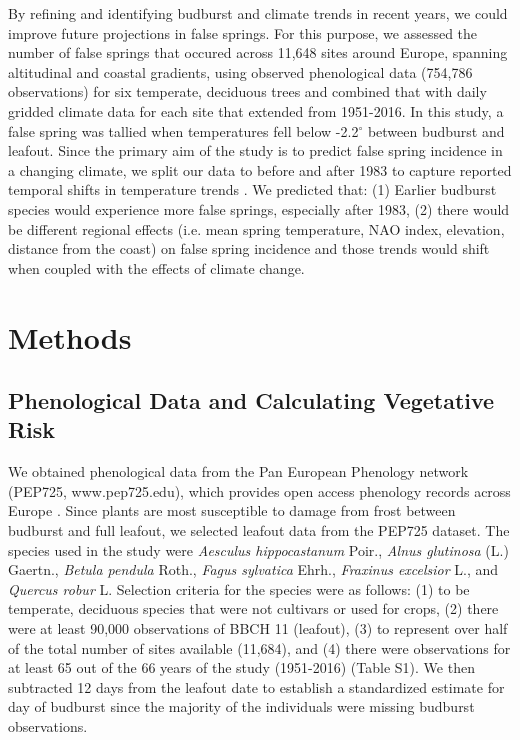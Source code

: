 \documentclass{article}\usepackage[]{graphicx}\usepackage[]{color}
\begin{document}
By refining and identifying budburst and climate trends in recent years, we could improve future projections in false springs. For this purpose, we assessed the number of false springs that occured across 11,648 sites around Europe, spanning altitudinal and coastal gradients, using observed phenological data (754,786 observations) for six temperate, deciduous trees and combined that with daily gridded climate data for each site that extended from 1951-2016. In this study, a false spring was tallied when temperatures fell below -2.2$^{\circ}$ \citep{Schwartz1993} between budburst and leafout. Since the primary aim of the study is to predict false spring incidence in a changing climate, we split our data to before and after 1983 to capture reported temporal shifts in temperature trends \citep{Kharouba2018, Stocker2013}. We predicted that: (1) Earlier budburst species would experience more false springs, especially after 1983, (2) there would be different regional effects (i.e. mean spring temperature, NAO index, elevation, distance from the coast) on false spring incidence and those trends would shift when coupled with the effects of climate change. 


\section*{Methods}
\subsection*{Phenological Data and Calculating Vegetative Risk}
We obtained phenological data from the Pan European Phenology network (PEP725, www.pep725.edu), which provides open access phenology records across Europe \citep{Templ2018}. Since plants are most susceptible to damage from frost between budburst and full leafout, we selected leafout data \citep[i.e., in][BBCH 11, which is defined as the point of leaf unfolding and the first visible leaf stalk]{Meier2001} from the PEP725 dataset. The species used in the study were \textit{Aesculus hippocastanum} Poir., \textit{Alnus glutinosa} (L.) Gaertn., \textit{Betula pendula} Roth., \textit{Fagus sylvatica} Ehrh., \textit{Fraxinus excelsior} L., and \textit{Quercus robur} L. Selection criteria for the species were as follows: (1) to be temperate, deciduous species that were not cultivars or used for crops, (2) there were at least 90,000 observations of BBCH 11 (leafout), (3) to represent over half of the total number of sites available (11,684), and (4) there were observations for at least 65 out of the 66 years of the study (1951-2016) (Table S1). We then subtracted 12 days from the leafout date to establish a standardized estimate for day of budburst \citep{Donnelly2017} since the majority of the individuals were missing budburst observations.
\end{document}
